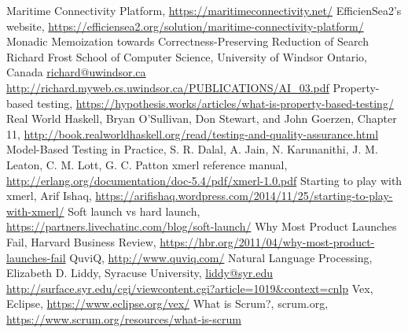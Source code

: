 \begin{thebibliography}{9}
    Maritime Connectivity Platform,
    \url{https://maritimeconnectivity.net/}
    EfficienSea2's website,
    \url{https://efficiensea2.org/solution/maritime-connectivity-platform/}
    Monadic Memoization towards Correctness-Preserving Reduction of Search
    Richard Frost
    School of Computer Science, University of Windsor
    Ontario, Canada
    \url{richard@uwindsor.ca}
    \url{http://richard.myweb.cs.uwindsor.ca/PUBLICATIONS/AI_03.pdf}
    Property-based testing,
    \url{https://hypothesis.works/articles/what-is-property-based-testing/}
    Real World Haskell,
    Bryan O'Sullivan, Don Stewart, and John Goerzen,
    Chapter 11,
    \url{http://book.realworldhaskell.org/read/testing-and-quality-assurance.html}
    Model-Based Testing in Practice,
    S. R. Dalal, A. Jain, N. Karunanithi,
    J. M. Leaton, C. M. Lott, G. C. Patton
    xmerl reference manual,
    \url{http://erlang.org/documentation/doc-5.4/pdf/xmerl-1.0.pdf}
    Starting to play with xmerl,
    Arif Ishaq,
    \url{https://arifishaq.wordpress.com/2014/11/25/starting-to-play-with-xmerl/}
    Soft launch vs hard launch,
    \url{https://partners.livechatinc.com/blog/soft-launch/}
    Why Most Product Launches Fail,
    Harvard Business Review,
    \url{https://hbr.org/2011/04/why-most-product-launches-fail}
    QuviQ,
    \url{http://www.quviq.com/}
    Natural Language Processing,
    Elizabeth D. Liddy,
    Syracuse University,
    \url{liddy@syr.edu}
    \url{http://surface.syr.edu/cgi/viewcontent.cgi?article=1019&context=cnlp}
    Vex,
    Eclipse,
    \url{https://www.eclipse.org/vex/}
    What is Scrum?,
    scrum.org,
    \url{https://www.scrum.org/resources/what-is-scrum}
\end{thebibliography}